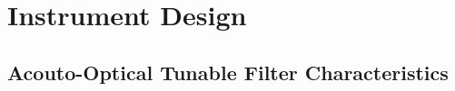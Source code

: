 \documentclass[12pt]{article}
\begin{document}
\section{Instrument Design}

\subsection{Acouto-Optical Tunable Filter Characteristics}

\end{document}
